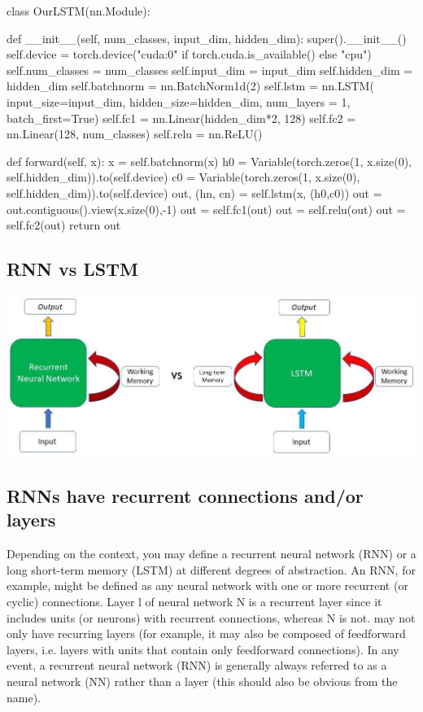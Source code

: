 \documentclass[12pt,a4paper]{article}
\begin{document}
    \begin{python}
    class OurLSTM(nn.Module):

    def __init__(self, num_classes, input_dim, hidden_dim):
        super().__init__()
        self.device = torch.device("cuda:0" if torch.cuda.is_available() else "cpu")
        self.num_classes = num_classes
        self.input_dim = input_dim
        self.hidden_dim = hidden_dim
        self.batchnorm = nn.BatchNorm1d(2)
        self.lstm = nn.LSTM(
            input_size=input_dim, 
            hidden_size=hidden_dim,
            num_layers = 1, 
            batch_first=True)
        self.fc1 = nn.Linear(hidden_dim*2, 128)
        self.fc2 = nn.Linear(128, num_classes)
        self.relu = nn.ReLU()

    def forward(self, x):
        x = self.batchnorm(x)
        h0 = Variable(torch.zeros(1, x.size(0), self.hidden_dim)).to(self.device)
        c0 = Variable(torch.zeros(1, x.size(0), self.hidden_dim)).to(self.device)
        out, (hn, cn) = self.lstm(x, (h0,c0))
        out = out.contiguous().view(x.size(0),-1)
        out = self.fc1(out)
        out = self.relu(out)
        out = self.fc2(out)
        return out
    \end{python}
    \newpage

    \subsection{RNN vs LSTM}
        \begin{center}
            \includegraphics[width= 400pt]{imgs/rnnlstm.jpg}
        \end{center}

        \subsection{RNNs have recurrent connections and/or layers}
        Depending on the context, you may define a recurrent neural network (RNN) or a long short-term memory (LSTM) at different degrees of abstraction. An RNN, for example, might be defined as any neural network with one or more recurrent (or cyclic) connections. Layer l of neural network N is a recurrent layer since it includes units (or neurons) with recurrent connections, whereas N is not.\newline
        may not only have recurring layers (for example, it may also be composed of feedforward layers, i.e. layers with units that contain only feedforward connections).\newline
        In any event, a recurrent neural network (RNN) is generally always referred to as a neural network (NN) rather than a layer (this should also be obvious from the name).
        \newpage
\end{document}
